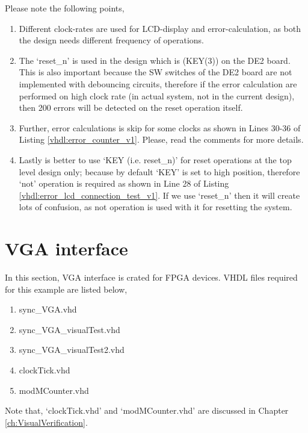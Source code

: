 \begin{noNumBox}
	Please note the following points, 
	
	\begin{enumerate}
		\item Different clock-rates are used for LCD-display and error-calculation, as both the design needs different frequency of operations. 
		\item The `reset\_n' is used in the design which is (KEY(3)) on the DE2 board. This is also important because the SW switches of the DE2 board are not implemented with debouncing circuits, therefore if the error calculation are performed on high clock rate (in actual system, not in the current design), then 200 errors will be detected on the reset operation itself. 
		\item Further, error calculations is skip for some clocks as shown in Lines 30-36 of Listing \ref{vhdl:error_counter_v1}. Please, read  the comments for more details. 
		\item Lastly is better to use `KEY (i.e. reset\_n)' for reset operations at the top level design only; because by default `KEY' is set to high position, therefore `not' operation is required as shown in Line 28 of Listing \ref{vhdl:error_lcd_connection_test_v1}. If we use `reset\_n' then it will create lots of confusion, as not operation is used with it for resetting the system. 
	\end{enumerate}
\end{noNumBox}









\section{VGA interface}
In this section, VGA interface is crated for FPGA devices. VHDL files required for this example are listed below, 
\begin{enumerate}
	\item sync\_VGA.vhd
	\item sync\_VGA\_visualTest.vhd
	\item sync\_VGA\_visualTest2.vhd
	\item clockTick.vhd
	\item modMCounter.vhd
\end{enumerate}
Note that, `clockTick.vhd' and `modMCounter.vhd' are discussed in Chapter \ref{ch:VisualVerification}.



